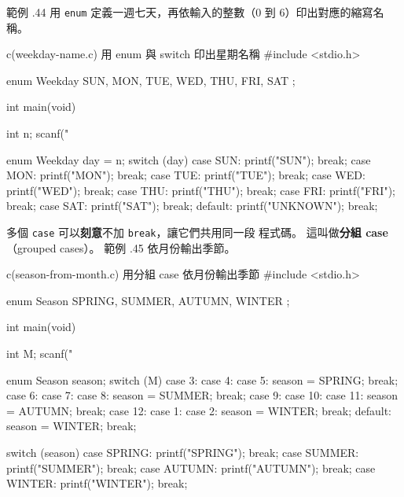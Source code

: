 範例 \thechapter.44 用 \texttt{enum} 定義一週七天，再依輸入的整數（$0$
到 $6$）印出對應的縮寫名稱。

\begin{example}{c}{(weekday-name.c) 用 enum 與 switch 印出星期名稱}
#include <stdio.h>

enum Weekday {
    SUN, MON, TUE, WED, THU, FRI, SAT
};

int main(void) {
    int n;
    scanf("%

    enum Weekday day = n;
    switch (day) {
        case SUN:
            printf("SUN\n");
            break;
        case MON:
            printf("MON\n");
            break;
        case TUE:
            printf("TUE\n");
            break;
        case WED:
            printf("WED\n");
            break;
        case THU:
            printf("THU\n");
            break;
        case FRI:
            printf("FRI\n");
            break;
        case SAT:
            printf("SAT\n");
            break;
        default:
            printf("UNKNOWN\n");
            break;
    }
}
\end{example}


多個 \texttt{case} 可以\textbf{刻意}不加 \texttt{break}，讓它們共用同一段
程式碼。 這叫做\textbf{分組 case}（grouped cases）。 範例 \thechapter.45
依月份輸出季節。

\begin{example}{c}{(season-from-month.c) 用分組 case 依月份輸出季節}
#include <stdio.h>

enum Season { SPRING, SUMMER, AUTUMN, WINTER };

int main(void) {
    int M;
    scanf("%

    enum Season season;
    switch (M) {
        case 3:
        case 4:
        case 5:
            season = SPRING;
            break;
        case 6:
        case 7:
        case 8:
            season = SUMMER;
            break;
        case 9:
        case 10:
        case 11:
            season = AUTUMN;
            break;
        case 12:
        case 1:
        case 2:
            season = WINTER;
            break;
        default:
            season = WINTER;
            break;
    }

    switch (season) {
        case SPRING:
            printf("SPRING\n");
            break;
        case SUMMER:
            printf("SUMMER\n");
            break;
        case AUTUMN:
            printf("AUTUMN\n");
            break;
        case WINTER:
            printf("WINTER\n");
            break;
    }
}
\end{example}

